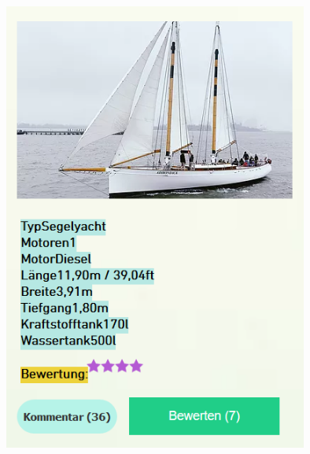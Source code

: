 \documentclass[12pt]{article}
\theoremstyle{definition}
\begin{document}
\begin{center}\includegraphics[width=10cm,height=15cm,keepaspectratio]{Bewerten.PNG}\end{center}
\end{document}
